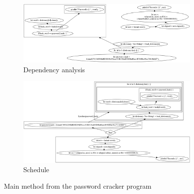 \begin{figure}
    \begin{subfigure}{\textwidth}
        \centering
        \includegraphics[width=\textwidth]{img/password-cracker/main-dependency-analysis.png}
        \caption{\label{fig:pass-deps}Dependency analysis}
        \vspace{1em}
    \end{subfigure}
    \begin{subfigure}{\textwidth}
        \centering
        \includegraphics[width=\textwidth]{img/password-cracker/main-schedule.png}
        \caption{\label{fig:pass-sch}Schedule}
    \end{subfigure}
    \caption{Main method from the password cracker program}
\end{figure}


